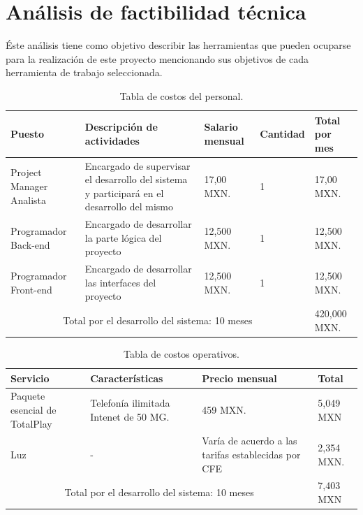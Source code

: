 	
	\section{An\'alisis de factibilidad t\'ecnica}
	\noindent Éste análisis tiene como objetivo describir las herramientas que pueden ocuparse para la realización de este proyecto mencionando sus objetivos de cada herramienta de trabajo seleccionada.
	
	\begin{table}[htbp]
		\begin{center}
			\begin{tabular}{|p{20mm}|p{30mm}|p{15mm}|p{15mm}|p{15mm}|}
				\hline
				\textbf{Puesto} & \textbf{Descripción de actividades} & \textbf{Salario mensual} & \textbf{Cantidad} & \textbf{Total por mes}\\ \hline 
				Project Manager Analista & Encargado de supervisar el desarrollo del sistema y participará en el desarrollo del mismo & 17,00 MXN. & 1 &17,00 MXN. \\ \hline
				
				Programador Back-end & Encargado de desarrollar la parte lógica del proyecto & 12,500 MXN. & 1 &12,500 MXN. \\ \hline
				
				Programador Front-end & Encargado de desarrollar las interfaces del proyecto & 12,500 MXN. & 1 &12,500 MXN.\\ \hline
				
				\multicolumn{4}{|c|}{Total por el desarrollo del sistema: 10 meses} & 420,000 MXN.\\ \hline
			\end{tabular}
			\caption{Tabla de costos del personal.}
			\label{tablacostopersonal}
		\end{center}
	\end{table}
	
	\begin{table}[htbp]
		\begin{center}
			\begin{tabular}{|p{20mm}|p{30mm}|p{15mm}|p{15mm}|}
				\hline
				\textbf{Servicio}  & \textbf{Características} & \textbf{Precio mensual} & \textbf{Total} \\ \hline 
				Paquete esencial de TotalPlay & Telefonía ilimitada Intenet de 50 MG. & 459 MXN. & 5,049 MXN \\ \hline
				
				Luz & - & Varía de acuerdo a las tarifas establecidas por CFE & 2,354 MXN. \\ \hline
				
				\multicolumn{3}{|c|}{Total por el desarrollo del sistema: 10 meses} & 7,403 MXN\\ \hline
			\end{tabular}
			\caption{Tabla de costos operativos.}
			\label{tablacostosoperativos}
		\end{center}
	\end{table}
	
